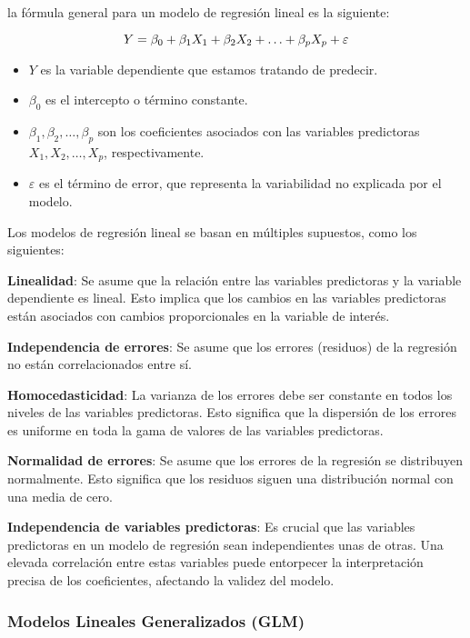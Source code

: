 \documentclass[
  11pt,
  bookmarksnumbered]{article}
\providecommand{\tightlist}{%
  \setlength{\itemsep}{0pt}\setlength{\parskip}{0pt}}
\begin{document}
la fórmula general para un modelo de regresión lineal es la siguiente: 

\begin{equation}
\large Y = \beta_0 + \beta_1 X_1 + \beta_2 X_2 + \ldots + \beta_p X_p + \varepsilon\end{equation}

\begin{itemize}
\tightlist
\item
  \(Y\) es la variable dependiente que estamos tratando de predecir.
\item
  \(\beta_0\) es el intercepto o término constante.
\item
  \(\beta_1, \beta_2, \ldots, \beta_p\) son los coeficientes asociados con las variables predictoras \(X_1, X_2, \ldots, X_p\), respectivamente.
\item
  \(\varepsilon\) es el término de error, que representa la variabilidad no explicada por el modelo.
\end{itemize}

Los modelos de regresión lineal se basan en múltiples supuestos, como los siguientes:

\textbf{Linealidad}: Se asume que la relación entre las variables predictoras y la variable dependiente es lineal.
Esto implica que los cambios en las variables predictoras están asociados con cambios proporcionales en la variable de interés.

\textbf{Independencia de errores}: Se asume que los errores (residuos) de la regresión no están correlacionados entre sí.

\textbf{Homocedasticidad}: La varianza de los errores debe ser constante en todos los niveles de las variables predictoras.
Esto significa que la dispersión de los errores es uniforme en toda la gama de valores de las variables predictoras.

\textbf{Normalidad de errores}: Se asume que los errores de la regresión se distribuyen normalmente.
Esto significa que los residuos siguen una distribución normal con una media de cero.

\textbf{Independencia de variables predictoras}: Es crucial que las variables predictoras en un modelo de regresión sean independientes unas de otras.
Una elevada correlación entre estas variables puede entorpecer la interpretación precisa de los coeficientes, afectando la validez del modelo.

\hypertarget{modelos-lineales-generalizados-glm}{%
\subsubsection{Modelos Lineales Generalizados (GLM)}\label{modelos-lineales-generalizados-glm}}
\end{document}
